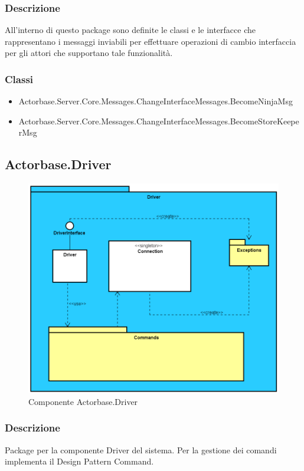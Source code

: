 \documentclass[a4paper]{article}
\begin{document}
			\subsubsection{Descrizione}
				All'interno di questo package sono definite le classi e le interfacce che rappresentano i messaggi inviabili per effettuare operazioni di cambio interfaccia per gli attori che supportano tale funzionalità.
			\subsubsection{Classi}
			\begin{itemize}
				\item Actorbase.Server.Core.Messages.ChangeInterfaceMessages.BecomeNinjaMsg
				\item Actorbase.Server.Core.Messages.ChangeInterfaceMessages.BecomeStoreKeeperMsg
			\end{itemize}
			
			
					\subsection{Actorbase.Driver}
		\begin{figure} [H]
			\centering
			\includegraphics[scale=0.5]{ST/Client/DriverSemplificato.png}
        	\caption{Componente Actorbase.Driver}
		\end{figure}
		
		\subsubsection{Descrizione}
			Package per la componente Driver del sistema. Per la gestione dei comandi implementa il Design Pattern Command.
			
\end{document}
